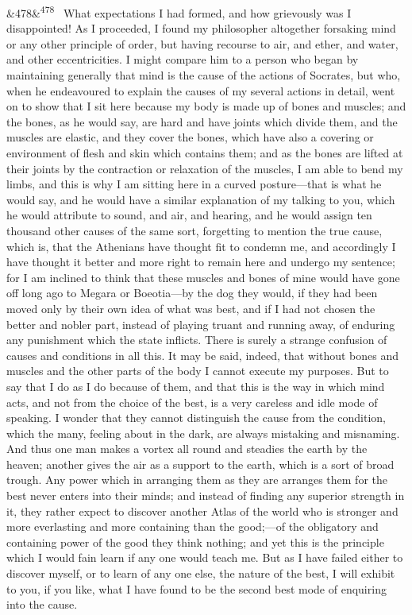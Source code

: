 \documentclass[12pt]{article}
\newcommand{\para}[1][]{\par\noindent\ifx&#1&\else\textsuperscript{\footnotesize #1}~\fi}
\begin{document}
\para[478] What expectations I had formed, and how grievously was I disappointed! As I proceeded, I found my philosopher altogether forsaking mind or any other principle of order, but having recourse to air, and ether, and water, and other eccentricities. I might compare him to a person who began by maintaining generally that mind is the cause of the actions of Socrates, but who, when he endeavoured to explain the causes of my several actions in detail, went on to show that I sit here because my body is made up of bones and muscles; and the bones, as he would say, are hard and have joints which divide them, and the muscles are elastic, and they cover the bones, which have also a covering or environment of flesh and skin which contains them; and as the bones are lifted at their joints by the contraction or relaxation of the muscles, I am able to bend my limbs, and this is why I am sitting here in a curved posture---that is what he would say, and he would have a similar explanation of my talking to you, which he would attribute to sound, and air, and hearing, and he would assign ten thousand other causes of the same sort, forgetting to mention the true cause, which is, that the Athenians have thought fit to condemn me, and accordingly I have thought it better and more right to remain here and undergo my sentence; for I am inclined to think that these muscles and bones of mine would have gone off long ago to Megara or Boeotia---by the dog they would, if they had been moved only by their own idea of what was best, and if I had not chosen the better and nobler part, instead of playing truant and running away, of enduring any punishment which the state inflicts. There is surely a strange confusion of causes and conditions in all this. It may be said, indeed, that without bones and muscles and the other parts of the body I cannot execute my purposes. But to say that I do as I do because of them, and that this is the way in which mind acts, and not from the choice of the best, is a very careless and idle mode of speaking. I wonder that they cannot distinguish the cause from the condition, which the many, feeling about in the dark, are always mistaking and misnaming. And thus one man makes a vortex all round and steadies the earth by the heaven; another gives the air as a support to the earth, which is a sort of broad trough. Any power which in arranging them as they are arranges them for the best never enters into their minds; and instead of finding any superior strength in it, they rather expect to discover another Atlas of the world who is stronger and more everlasting and more containing than the good;---of the obligatory and containing power of the good they think nothing; and yet this is the principle which I would fain learn if any one would teach me. But as I have failed either to discover myself, or to learn of any one else, the nature of the best, I will exhibit to you, if you like, what I have found to be the second best mode of enquiring into the cause.
\end{document}
